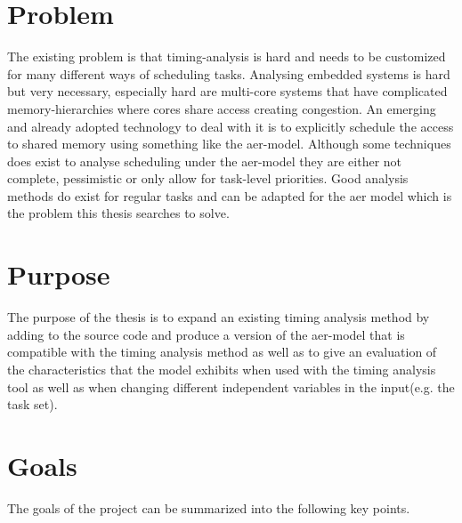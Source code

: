 \documentclass{kththesis}
\begin{document}
\section{Problem}

The existing problem is that timing-analysis is hard and needs to be customized for many
different ways of scheduling tasks. Analysing embedded systems is hard but very necessary,
especially hard are multi-core systems that have complicated memory-hierarchies where cores share
access creating congestion. An emerging and already adopted technology to deal with it is to
explicitly schedule the access to shared memory using something like the \acrshort{aer}-model.
Although some techniques does exist to analyse scheduling under the \acrshort{aer}-model they are
either not complete, pessimistic or only allow for task-level priorities. Good analysis methods do
exist for regular tasks and can be adapted for the \acrshort{aer} model which is the problem this
thesis searches to solve.



\section{Purpose}

The purpose of the thesis is to expand an existing timing analysis method by adding to the source
code and produce a version of the \acrshort{aer}-model that is compatible with the timing analysis
method as well as to give an evaluation of the characteristics that the model exhibits when used
with the timing analysis tool as well as when changing different independent variables in the
input(e.g. the task set).


\section{Goals}

The goals of the project can be summarized into the following key points.
\end{document}

